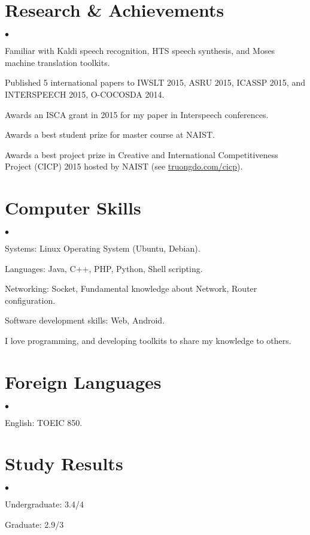 \documentclass[margin,line]{res}
\newenvironment{list2}{
  \begin{list}{$\bullet$}{%
      \setlength{\itemsep}{0in}
      \setlength{\parsep}{0in} \setlength{\parskip}{0in}
      \setlength{\topsep}{0in} \setlength{\partopsep}{0in}
      \setlength{\leftmargin}{0.2in}}}{\end{list}}
\begin{document}
\begin{resume}
\section{\sc Research \& Achievements}
\begin{list2}
\item Familiar with Kaldi speech recognition, HTS speech synthesis, and Moses machine translation toolkits.
\item Published 5 international papers to IWSLT 2015, ASRU 2015, ICASSP 2015, and INTERSPEECH 2015, O-COCOSDA 2014.
\item Awards an ISCA grant in 2015 for my paper in Interspeech conferences.
\item Awards a best student prize for master course at NAIST.
\item Awards a best project prize in Creative and International Competitiveness Project (CICP) 2015 hosted by NAIST (see \url{truongdo.com/cicp}).
\end{list2}

\section{\sc Computer Skills }
\begin{list2}
\item Systems: Linux Operating System (Ubuntu, Debian).
\item Languages: Java, C++, PHP, Python, Shell scripting.
\item Networking: Socket, Fundamental knowledge about Network, Router configuration.
\item Software development skills: Web, Android.
\item I love programming, and developing toolkits to share my knowledge to others.
\end{list2}
\section{\sc Foreign Languages}
\begin{list2}
\item English: TOEIC 850.
\end{list2}
\section{\sc Study Results}
\begin{list2}
\item Undergraduate: 3.4/4
\item Graduate: 2.9/3
\end{list2}


\end{resume}
\end{document}
